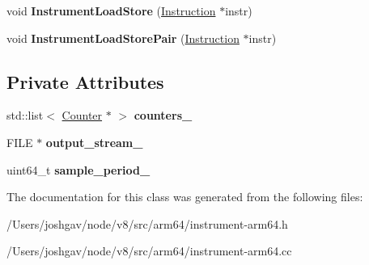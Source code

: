 \begin{DoxyCompactItemize}
\item 
void {\bfseries Instrument\+Load\+Store} (\hyperlink{classv8_1_1internal_1_1_instruction}{Instruction} $\ast$instr)\hypertarget{classv8_1_1internal_1_1_instrument_ad5d76c2ec3b65ebb8e7c43dce6cc7a7b}{}\label{classv8_1_1internal_1_1_instrument_ad5d76c2ec3b65ebb8e7c43dce6cc7a7b}

\item 
void {\bfseries Instrument\+Load\+Store\+Pair} (\hyperlink{classv8_1_1internal_1_1_instruction}{Instruction} $\ast$instr)\hypertarget{classv8_1_1internal_1_1_instrument_ad779e03b660d66c26c567bd96f0c7dd3}{}\label{classv8_1_1internal_1_1_instrument_ad779e03b660d66c26c567bd96f0c7dd3}

\end{DoxyCompactItemize}
\subsection*{Private Attributes}
\begin{DoxyCompactItemize}
\item 
std\+::list$<$ \hyperlink{classv8_1_1internal_1_1_counter}{Counter} $\ast$ $>$ {\bfseries counters\+\_\+}\hypertarget{classv8_1_1internal_1_1_instrument_a21ace3d86fc8997d6ea449fe6b9aa3ed}{}\label{classv8_1_1internal_1_1_instrument_a21ace3d86fc8997d6ea449fe6b9aa3ed}

\item 
F\+I\+LE $\ast$ {\bfseries output\+\_\+stream\+\_\+}\hypertarget{classv8_1_1internal_1_1_instrument_a1675d885fef89cb6cdd45ba17371e624}{}\label{classv8_1_1internal_1_1_instrument_a1675d885fef89cb6cdd45ba17371e624}

\item 
uint64\+\_\+t {\bfseries sample\+\_\+period\+\_\+}\hypertarget{classv8_1_1internal_1_1_instrument_a437c710d5027b8d6371b306eebcc9a68}{}\label{classv8_1_1internal_1_1_instrument_a437c710d5027b8d6371b306eebcc9a68}

\end{DoxyCompactItemize}


The documentation for this class was generated from the following files\+:\begin{DoxyCompactItemize}
\item 
/\+Users/joshgav/node/v8/src/arm64/instrument-\/arm64.\+h\item 
/\+Users/joshgav/node/v8/src/arm64/instrument-\/arm64.\+cc\end{DoxyCompactItemize}

